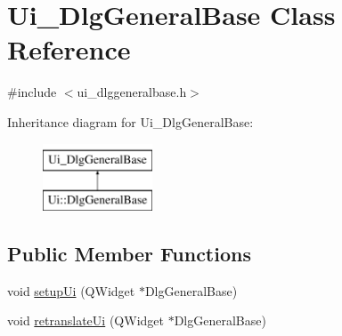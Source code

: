 \hypertarget{classUi__DlgGeneralBase}{\section{Ui\+\_\+\+Dlg\+General\+Base Class Reference}
\label{classUi__DlgGeneralBase}
}


{\ttfamily \#include $<$ui\+\_\+dlggeneralbase.\+h$>$}

Inheritance diagram for Ui\+\_\+\+Dlg\+General\+Base\+:\begin{figure}[H]
\begin{center}
\leavevmode
\includegraphics[height=2.000000cm]{classUi__DlgGeneralBase}
\end{center}
\end{figure}
\subsection*{Public Member Functions}
\begin{DoxyCompactItemize}
\item 
void \hyperlink{classUi__DlgGeneralBase_afdf9980931d308cb844e05466ac47978}{setup\+Ui} (Q\+Widget $\ast$Dlg\+General\+Base)
\item 
void \hyperlink{classUi__DlgGeneralBase_a6040814bf756535c48fc3691f48b2213}{retranslate\+Ui} (Q\+Widget $\ast$Dlg\+General\+Base)
\end{DoxyCompactItemize}
